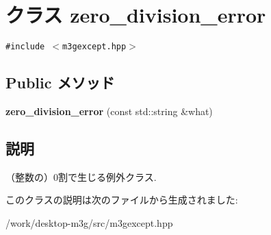 \hypertarget{classm3g_1_1zero__division__error}{
\section{クラス zero\_\-division\_\-error}
\label{classm3g_1_1zero__division__error}
}
{\tt \#include $<$m3gexcept.hpp$>$}

\subsection*{Public メソッド}
\begin{CompactItemize}
\item 
\hypertarget{classm3g_1_1zero__division__error_b5d399df97c6b33de2f21b7eecfd4d53}{
\textbf{zero\_\-division\_\-error} (const std::string \&what)}
\label{classm3g_1_1zero__division__error_b5d399df97c6b33de2f21b7eecfd4d53}

\end{CompactItemize}


\subsection{説明}
（整数の）0割で生じる例外クラス. 

このクラスの説明は次のファイルから生成されました:\begin{CompactItemize}
\item 
/work/desktop-m3g/src/m3gexcept.hpp\end{CompactItemize}

